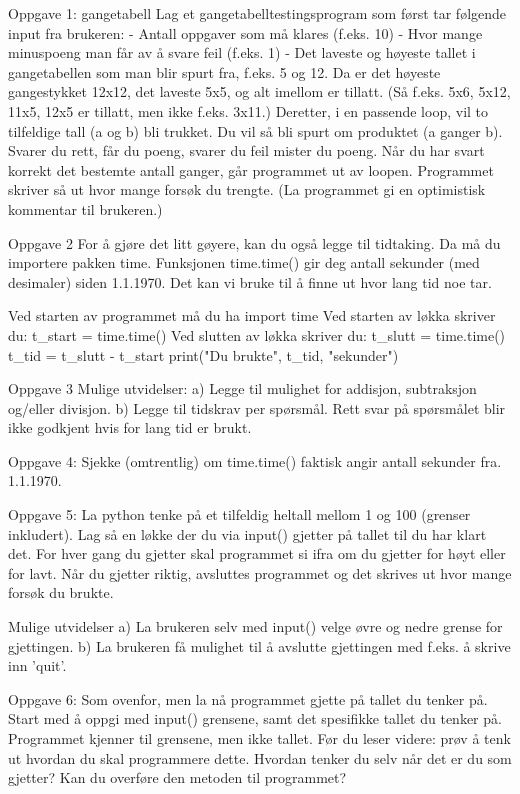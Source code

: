 Oppgave 1: gangetabell
Lag et gangetabelltestingsprogram som først tar følgende input fra brukeren:
- Antall oppgaver som må klares (f.eks. 10)
- Hvor mange minuspoeng man får av å svare feil (f.eks. 1)
- Det laveste og høyeste tallet i gangetabellen som man blir spurt fra, f.eks. 5 og 12.
Da er det høyeste gangestykket 12x12, det laveste 5x5, og alt imellom er tillatt.
(Så f.eks. 5x6, 5x12, 11x5, 12x5 er tillatt, men ikke f.eks. 3x11.) 
Deretter, i en passende loop, vil to tilfeldige tall (a og b) bli trukket.
Du vil så bli spurt om produktet (a ganger b).
Svarer du rett, får du poeng, svarer du feil mister du poeng.
Når du har svart korrekt det bestemte antall ganger, går programmet ut av loopen. 
Programmet skriver så ut hvor mange forsøk du trengte.
(La programmet gi en optimistisk kommentar til brukeren.) 


Oppgave 2
For å gjøre det litt gøyere, kan du også legge til tidtaking. 
Da må du importere pakken time.
Funksjonen time.time() gir deg antall sekunder (med desimaler) siden 1.1.1970.
Det kan vi bruke til å finne ut hvor lang tid noe tar.

Ved starten av programmet må du ha
import time
Ved starten av løkka skriver du: 
t_start = time.time()
Ved slutten av løkka skriver du: 
t_slutt = time.time()
t_tid = t_slutt - t_start
print("Du brukte", t_tid, "sekunder")


Oppgave 3
Mulige utvidelser:
a) Legge til mulighet for addisjon, subtraksjon og/eller divisjon. 
b) Legge til tidskrav per spørsmål.
Rett svar på spørsmålet blir ikke godkjent hvis for lang tid er brukt. 


Oppgave 4:
Sjekke (omtrentlig) om time.time() faktisk angir antall sekunder fra. 1.1.1970. 


Oppgave 5:
La python tenke på et tilfeldig heltall mellom 1 og 100 (grenser inkludert). 
Lag så en løkke der du via input() gjetter på tallet til du har klart det. 
For hver gang du gjetter skal programmet si ifra om du gjetter for høyt eller for lavt.
Når du gjetter riktig, avsluttes programmet og det skrives ut hvor mange forsøk du brukte. 

Mulige utvidelser
a) La brukeren selv med input() velge øvre og nedre grense for gjettingen.
b) La brukeren få mulighet til å avslutte gjettingen med f.eks. å skrive inn 'quit'.


Oppgave 6: Som ovenfor, men la nå programmet gjette på tallet du tenker på.
Start med å oppgi med input() grensene, samt det spesifikke tallet du tenker på.
Programmet kjenner til grensene, men ikke tallet.
Før du leser videre: prøv å tenk ut hvordan du skal programmere dette.
Hvordan tenker du selv når det er du som gjetter?
Kan du overføre den metoden til programmet?

